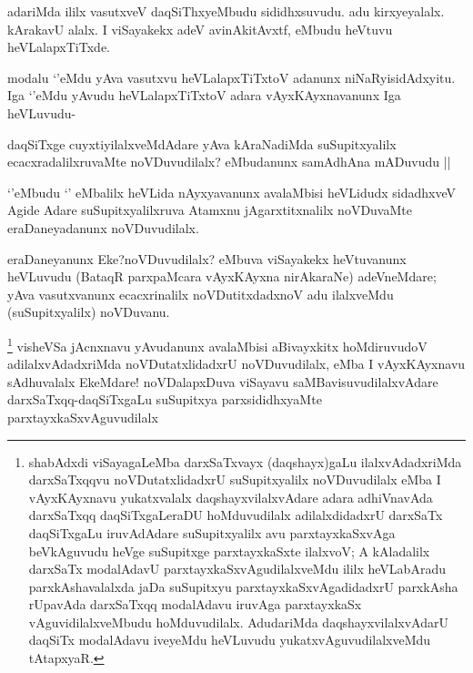 \begin{artha}
adariMda ililx vasutxveV daqSiThxyeMbudu sididhxsuvudu. adu kirxyeyalalx. kArakavU alalx. I viSayakekx adeV avinAkitAvxtf, eMbudu heVtuvu heVLalapxTiTxde.
\end{artha}

\begin{artha}
modalu `\stext'eMdu yAva vasutxvu heVLalapxTiTxtoV adanunx niNaRyisidAdxyitu. Iga `\stext'eMdu yAvudu heVLalapxTiTxtoV adara vAyxKAyxnavanunx Iga heVLuvudu-
\end{artha}

\begin{artha}
daqSiTxge cuyxtiyilalxveMdAdare yAva kAraNadiMda suSupitxyalilx ecacxradalilxruvaMte noVDuvudilalx? eMbudanunx samAdhAna mADuvudu ||
\end{artha}

\begin{artha}
`\stext'eMbudu `\stext' eMbalilx heVLida nAyxyavanunx avalaMbisi heVLidudx sidadhxveV Agide Adare suSupitxyalilxruva Atamxnu jAgarxtitxnalilx noVDuvaMte eraDaneyadanunx noVDuvudilalx.
\end{artha}

\begin{artha}
eraDaneyanunx Eke?noVDuvudilalx? eMbuva viSayakekx heVtuvanunx heVLuvudu (BataqR parxpaMcara vAyxKAyxna nirAkaraNe) adeVneMdare; yAva vasutxvanunx ecacxrinalilx noVDutitxdadxnoV adu ilalxveMdu (suSupitxyalilx) noVDuvanu.
\end{artha}


\begin{artha}
\footnote{shabAdxdi viSayagaLeMba darxSaTxvayx (daqshayx)gaLu ilalxvAdadxriMda darxSaTxqqvu noVDutatxlidadxrU suSupitxyalilx noVDuvudilalx eMba I vAyxKAyxnavu yukatxvalalx daqshayxvilalxvAdare adara adhiVnavAda darxSaTxqq daqSiTxgaLeraDU hoMduvudilalx adilalxdidadxrU darxSaTx daqSiTxgaLu iruvAdAdare suSupitxyalilx avu parxtayxkaSxvAga beVkAguvudu heVge suSupitxge parxtayxkaSxte ilalxvoV; A kAladalilx darxSaTx modalAdavU parxtayxkaSxvAgudilalxveMdu ililx heVLabAradu parxkAshavalalxda jaDa suSupitxyu parxtayxkaSxvAgadidadxrU parxkAsha rUpavAda darxSaTxqq modalAdavu iruvAga parxtayxkaSx vAguvidilalxveMbudu hoMduvudilalx. AdudariMda daqshayxvilalxvAdarU daqSiTx modalAdavu iveyeMdu heVLuvudu yukatxvAguvudilalxveMdu tAtapxyaR.}
visheVSa jAcnxnavu yAvudanunx avalaMbisi aBivayxkitx hoMdiruvudoV adilalxvAdadxriMda noVDutatxlidadxrU noVDuvudilalx, eMba I vAyxKAyxnavu sAdhuvalalx EkeMdare! noVDalapxDuva viSayavu saMBavisuvudilalxvAdare darxSaTxqq-daqSiTxgaLu suSupitxya parxsididhxyaMte parxtayxkaSxvAguvudilalx
\end{artha}

